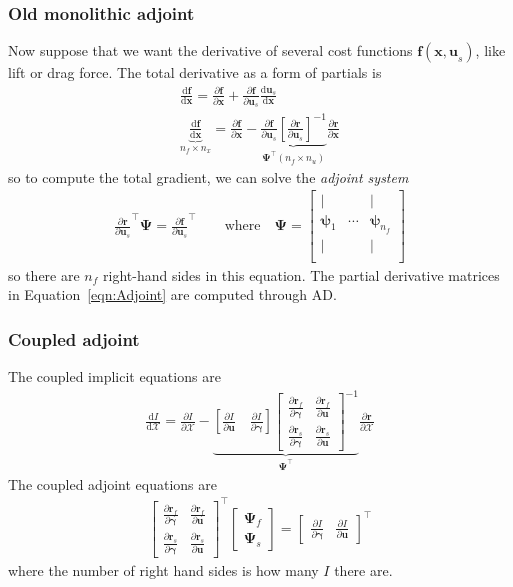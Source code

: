 \documentclass[10pt]{article}
\newcommand{\pp}[2]{\frac{\partial #1}{\partial #2}}
\newcommand{\dd}[2]{\frac{\textrm{d} #1}{\textrm{d} #2}}
\newcommand{\mb}[1]{\boldsymbol{\mathbf{#1}}} %
\newcommand{\mbf}[1]{\mathbf{#1}}
\newcommand{\mbs}[1]{\boldsymbol{#1}}
\newcommand{\mcal}[1]{\mathcal{#1}} %
\newcommand{\be}{\begin{eqnarray}}
\newcommand{\ee}{\end{eqnarray}}
\newcommand{\beq}{\begin{equation}\begin{aligned}}
\newcommand{\eeq}{\end{aligned}\end{equation}}
\newcommand{\tn}[1]{\textrm{#1}}
\begin{document}
\subsubsection{Old monolithic adjoint}
% 
Now suppose that we want the derivative of several cost functions $\mbf{f}(\mbf{x,u}_s)$, like lift or drag force.
The total derivative as a form of partials \cite[Sec. 6.7.2]{Martins2022} is
\be
\dd{\mbf{f}}{\mbf{x}} =
\pp{\mbf{f}}{\mbf{x}} + \pp{\mbf{f}}{\mbf{u}_s} \dd{\mbf{u}_s}{\mbf{x}}
\\
\label{eqn:Adjoint}
\boxed{
	\underbrace{
		\dd{ \mbf{f}}{\mbf{x}}
	}_{n_f \times n_x}
	= \pp{\mbf{f}}{\mbf{x}}
	-
	\underbrace{\pp{\mbf{f}}{\mbf{u}_s} \left[\pp{\mbf{r}}{\mbf{u}_s}\right]^{-1}
	}_{\boldsymbol{\Psi^\top} (n_f \times n_u)}
	\pp{\mbf{r}}{\mbf{x}}
}
\ee
so to compute the total gradient, we can solve the \emph{adjoint system}
\be
\pp{\mbf{r}}{\mbf{u}_s}^\top \boldsymbol{\Psi}
=
\pp{\mbf{f}}{\mbf{u}_s}^\top
\qquad
\tn{where}
\quad
\boldsymbol{\Psi} = \begin{bmatrix}
	|                   &        & |                       \\
	\boldsymbol{\psi}_1 & \cdots & \boldsymbol{\psi}_{n_f} \\
	|                   &        & |                       \\
\end{bmatrix}
\ee
so there are $n_f$ right-hand sides in this equation.
The partial derivative matrices in Equation~\eqref{eqn:Adjoint} are computed through \ac{AD}.

\subsubsection{Coupled adjoint}


The coupled implicit equations are
\beq
\dd{I}{\mcal{X}} =
\pp{I}{\mcal{X}}
-
\underbrace{
\left[\pp{I}{\mbf{u}} \quad \pp{I}{\mbs{\gamma}} \right]
\begin{bmatrix}
	\pp{\mbf{r}_f}{\mb{\gamma}} & \pp{\mbf{r}_f}{\mb{u}}
	\\
	\pp{\mbf{r}_s}{\mb{\gamma}} & \pp{\mbf{r}_s}{\mb{u}}
\end{bmatrix}
^{-1}
}_{\boldsymbol{\Psi^\top}}
\pp{\mbf{r}}{\mcal{X}}
\eeq
The coupled adjoint equations are
\beq
\begin{bmatrix}
	\pp{\mb{r}_f}{\mb{\gamma}} & \pp{\mb{r}_f}{\mb{u}}
	\\
	\pp{\mb{r}_s}{\mb{\gamma}} & \pp{\mb{r}_s}{\mb{u}}
\end{bmatrix}^\top
\begin{bmatrix}
	\mb{\Psi}_f \\
	\mb{\Psi}_s
\end{bmatrix}
=
\begin{bmatrix}
	\pp{I}{\mb{\gamma}} & \pp{I}{\mb{u}}
\end{bmatrix}^\top
\eeq
where the number of right hand sides is how many $I$ there are.
\end{document}
